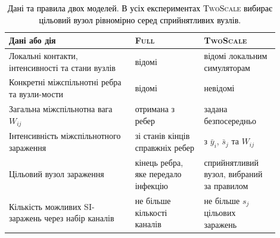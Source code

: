 \documentclass[a4paper,fleqn]{cas-sc}
\newcommand{\ibar}{\bar{y}}
\newcommand{\sbar}{\bar{s}}
\newcommand{\Full}{\textup{\textsc{Full}}}
\newcommand{\TS}{\textup{\textsc{TwoScale}}}
\begin{document}
\begin{table}[tbp]
\color{black}\centering
\caption{\textcolor{black}{Дані та правила двох моделей. В усіх експериментах \TS{} вибирає цільовий вузол рівномірно серед сприйнятливих вузлів.}}
\label{tab:information}
\small
\begin{tabular}{>{\raggedright\arraybackslash}p{0.42\linewidth}>{\raggedright\arraybackslash}p{0.23\linewidth}>{\raggedright\arraybackslash}p{0.25\linewidth}}
\toprule
Дані або дія & \Full{} & \TS{}\\
\midrule
Локальні контакти, інтенсивності та стани вузлів & відомі & відомі локальним симуляторам\\
Конкретні міжспільнотні ребра та вузли-мости & відомі & невідомі\\
Загальна міжспільнотна вага $W_{ij}$ & отримана з ребер & задана безпосередньо\\
Інтенсивність міжспільнотного зараження & зі станів кінців справжніх ребер & з $\ibar_i$, $\sbar_j$ та $W_{ij}$\\
Цільовий вузол зараження & кінець ребра, яке передало інфекцію & сприйнятливий вузол, вибраний за правилом\\
Кількість можливих SI-заражень через набір каналів & не більше кількості каналів & не більше $s_j$ цільових заражень\\
\bottomrule
\end{tabular}
\end{table}
\end{document}
